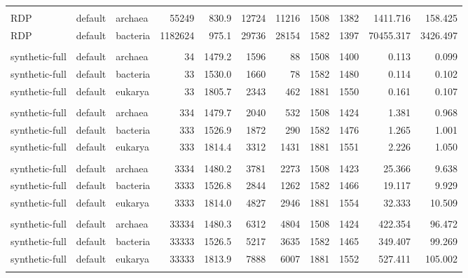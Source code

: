 \begin{table}
\begin{center}
\begin{tabular}{lllrrrrrrrr}
& & & & & & & & & & \\ 
RDP             & default  & archaea  &   55249 &  830.9 & 12724 & 11216 &  1508 &  1382 &   1411.716 &    158.425 \\
RDP             & default  & bacteria & 1182624 &  975.1 & 29736 & 28154 &  1582 &  1397 &  70455.317 &   3426.497 \\ \hline
& & & & & & & & & & \\ \hline
synthetic-full  & default  & archaea  &      34 & 1479.2 &  1596 &    88 &  1508 &  1400 &      0.113 &      0.099 \\
synthetic-full  & default  & bacteria &      33 & 1530.0 &  1660 &    78 &  1582 &  1480 &      0.114 &      0.102 \\
synthetic-full  & default  & eukarya  &      33 & 1805.7 &  2343 &   462 &  1881 &  1550 &      0.161 &      0.107 \\
& & & & & & & & & & \\ 
synthetic-full  & default  & archaea  &     334 & 1479.7 &  2040 &   532 &  1508 &  1424 &      1.381 &      0.968 \\
synthetic-full  & default  & bacteria &     333 & 1526.9 &  1872 &   290 &  1582 &  1476 &      1.265 &      1.001 \\
synthetic-full  & default  & eukarya  &     333 & 1814.4 &  3312 &  1431 &  1881 &  1551 &      2.226 &      1.050 \\
& & & & & & & & & & \\ 
synthetic-full  & default  & archaea  &    3334 & 1480.2 &  3781 &  2273 &  1508 &  1423 &     25.366 &      9.638 \\
synthetic-full  & default  & bacteria &    3333 & 1526.8 &  2844 &  1262 &  1582 &  1466 &     19.117 &      9.929 \\
synthetic-full  & default  & eukarya  &    3333 & 1814.0 &  4827 &  2946 &  1881 &  1554 &     32.333 &     10.509 \\
& & & & & & & & & & \\ 
synthetic-full  & default  & archaea  &   33334 & 1480.3 &  6312 &  4804 &  1508 &  1424 &    422.354 &     96.472 \\
synthetic-full  & default  & bacteria &   33333 & 1526.5 &  5217 &  3635 &  1582 &  1465 &    349.407 &     99.269 \\
synthetic-full  & default  & eukarya  &   33333 & 1813.9 &  7888 &  6007 &  1881 &  1552 &    527.411 &    105.002 \\
& & & & & & & & & & \\ 

\end{tabular}
\end{center}
\end{table}
